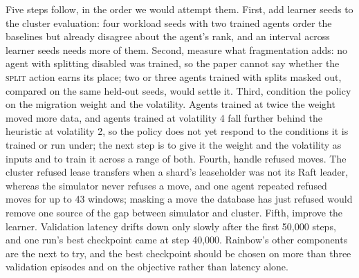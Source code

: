Five steps follow, in the order we would attempt them. First, add learner
seeds to the cluster evaluation: four workload seeds with two trained agents
order the baselines but already disagree about the agent's rank, and an
interval across learner seeds needs more of them. Second, measure what
fragmentation adds: no agent with splitting disabled was trained, so the paper
cannot say whether the \textsc{split} action earns its place; two or three
agents trained with splits masked out, compared on the same held-out seeds,
would settle it. Third, condition the policy on the migration weight and the
volatility. Agents trained at twice the weight moved more data, and
agents trained at volatility 4 fall further behind the heuristic at
volatility 2, so the policy does not yet respond to the conditions it is
trained or run under; the next step is to give it the weight and the
volatility as inputs and to train it across a range of both. Fourth, handle
refused moves. The cluster refused lease transfers when a shard's leaseholder
was not its Raft leader, whereas the simulator never refuses a move, and one
agent repeated refused moves for up to 43 windows; masking a move the database
has just refused would remove one source of the gap between simulator and
cluster. Fifth, improve the learner. Validation latency drifts down only slowly
after the first 50{,}000 steps, and one run's best checkpoint came at step
40{,}000. Rainbow's other components~\cite{hessel2018rainbow} are the next to
try, and the best checkpoint should be chosen on more than three validation
episodes and on the objective rather than latency alone.
